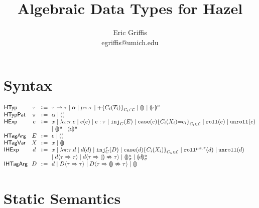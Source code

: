 \documentclass{article}
\title{Algebraic Data Types for Hazel}
\author{Eric Griffis \\ egriffis@umich.edu}
\date{}
\let\originalleft\left
\let\originalright\right
\renewcommand{\left}{\mathopen{}\mathclose\bgroup\originalleft}
\renewcommand{\right}{\aftergroup\egroup\originalright}
\newcommand\Sort[1]{\mathsf{#1}}
\newcommand\IHExp{\Sort{IHExp}}
\newcommand\IHTagArg{\Sort{IHTagArg}}
\newcommand\HExp{\Sort{HExp}}
\newcommand\HTagArg{\Sort{HTagArg}}
\newcommand\HTagVar{\Sort{HTagVar}}
\newcommand\HTyp{\Sort{HTyp}}
\newcommand\HTypPat{\Sort{HTypPat}}
\newcommand\hole[2][]{\llparenthesis#1\rrparenthesis^{#2}}
\newcommand\Dhole[3][]{\llparenthesis#1\rrparenthesis_{#2}^{#3}}
\newcommand\Tarrow[2]{#1 \rightarrow #2}
\newcommand\Trec[2]{\mu{#1}.{#2}}
\newcommand\Tsum[1]{+\mathopen{}\left\{#1\right\}}
\newcommand\TagSet{\mathcal{C}}
\newcommand\literal[1]{\mathtt{#1}}
\newcommand\asc[2]{{#1}:{#2}}
\newcommand\Efun[3]{\lambda{#1}{:}{#2}.{#3}}
\newcommand\Eapp[2]{{#1}\left({#2}\right)}
\newcommand\Einj[2]{\literal{inj}_{#1}\left({#2}\right)}
\newcommand\Ecase[2]{\literal{case} \left({#1}\right) \left\{{#2}\right\}}
\newcommand\Eroll[1]{\literal{roll}\left(#1\right)}
\newcommand\Eunroll[1]{\literal{unroll}\left(#1\right)}
\newcommand\Dfun[3]{\lambda{#1}{:}{#2}.{#3}}
\newcommand\Dapp[2]{{#1}\left({#2}\right)}
\newcommand\Dinj[3]{\literal{inj}_{#1}^{#2}\left({#3}\right)}
\newcommand\Dcase[2]{\literal{case} \left({#1}\right) \left\{{#2}\right\}}
\newcommand\Droll[3]{\literal{roll}^{\Trec{#1}{#2}}\left({#3}\right)}
\newcommand\Dunroll[1]{\literal{unroll}\left(#1\right)}
\newcommand\cast[3]{{#1}\langle{#2}\Rightarrow{#3}\rangle}
\newcommand\castfail[3]{{#1}\langle{#2}\Rightarrow{\llparenthesis\rrparenthesis}\nRightarrow{#3}\rangle}
\begin{document}
\maketitle


\section{Syntax}

\[
  \arraycolsep=0pt
  \begin{array}{l@{~~}c@{~~}c@{~~}l}
    \HTyp & \tau & \Coloneqq &
      \Tarrow{\tau}{\tau}
      \mid \alpha
      \mid \Trec{\pi}{\tau}
      \mid \Tsum{C_i(T_i)}_{C_i \in \TagSet}
      \mid \hole{}
      \mid \hole[\tau]{u}
      \\
    \HTypPat & \pi & \Coloneqq & \alpha \mid \hole{} \\
    \HExp & e & \Coloneqq &
      x
      \mid \Efun{x}{\tau}{e}
      \mid \Eapp{e}{e}
      \mid \asc{e}{\tau}
      \mid \Einj{C}{E}
      \mid \Ecase{e}{C_i(X_i){=}e_i}_{C_i \in \TagSet}
      \mid \Eroll{e}
      \mid \Eunroll{e}
      \\ & & &
      \mid \hole{u}
      \mid \hole[e]{u}
      \\
    \HTagArg & E & \Coloneqq & e \mid \hole{} \\
    \HTagVar & X & \Coloneqq & x \mid \hole{} \\
    \IHExp & d & \Coloneqq &
      x
      \mid \Dfun{\pi}{\tau}{d}
      \mid \Dapp{d}{d}
      \mid \Dinj{C}{\tau}{D}
      \mid \Dcase{d}{C_i(X_i)}_{C_u \in \TagSet}
      \mid \Droll{\alpha}{\tau}{d}
      \mid \Dunroll{d}
      \\ & & &
      \mid \cast{d}{\tau}{\tau}
      \mid \castfail{d}{\tau}{\tau}
      \mid \Dhole{\sigma}{u}
      \mid \Dhole[d]{\sigma}{u}
      \\
    \IHTagArg & D & \Coloneqq &
      d
      \mid \cast{D}{\tau}{\tau}
      \mid \castfail{D}{\tau}{\tau}
      \mid \hole{}
      \\
  \end{array}
\]


\section{Static Semantics}
\end{document}
